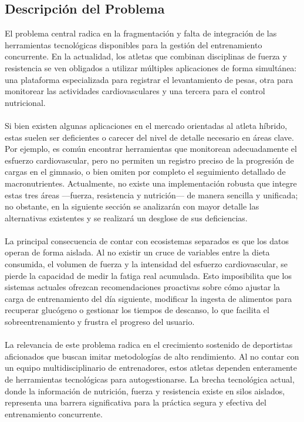 \documentclass[12pt]{article}
\begin{document}
\subsection{Descripción del Problema}
El problema central radica en la fragmentación y falta de integración de las herramientas tecnológicas disponibles para la gestión del entrenamiento concurrente. En la actualidad, los atletas que combinan disciplinas de fuerza y resistencia se ven obligados a utilizar múltiples aplicaciones de forma simultánea: una plataforma especializada para registrar el levantamiento de pesas, otra para monitorear las actividades cardiovasculares y una tercera para el control nutricional.
\\\\
Si bien existen algunas aplicaciones en el mercado orientadas al atleta híbrido, estas suelen ser deficientes o carecer del nivel de detalle necesario en áreas clave. Por ejemplo, es común encontrar herramientas que monitorean adecuadamente el esfuerzo cardiovascular, pero no permiten un registro preciso de la progresión de cargas en el gimnasio, o bien omiten por completo el seguimiento detallado de macronutrientes. Actualmente, no existe una implementación robusta que integre estas tres áreas ---fuerza, resistencia y nutrición--- de manera sencilla y unificada; no obstante, en la siguiente sección se analizarán con mayor detalle las alternativas existentes y se realizará un desglose de sus deficiencias.
\\\\
La principal consecuencia de contar con ecosistemas separados es que los datos operan de forma aislada. Al no existir un cruce de variables entre la dieta consumida, el volumen de fuerza y la intensidad del esfuerzo cardiovascular, se pierde la capacidad de medir la fatiga real acumulada. Esto imposibilita que los sistemas actuales ofrezcan recomendaciones proactivas sobre cómo ajustar la carga de entrenamiento del día siguiente, modificar la ingesta de alimentos para recuperar glucógeno o gestionar los tiempos de descanso, lo que facilita el sobreentrenamiento y frustra el progreso del usuario.
\\\\
La relevancia de este problema radica en el crecimiento sostenido de deportistas aficionados que buscan imitar metodologías de alto rendimiento. Al no contar con un equipo multidisciplinario de entrenadores, estos atletas dependen enteramente de herramientas tecnológicas para autogestionarse. La brecha tecnológica actual, donde la información de nutrición, fuerza y resistencia existe en silos aislados, representa una barrera significativa para la práctica segura y efectiva del entrenamiento concurrente.
\end{document}
